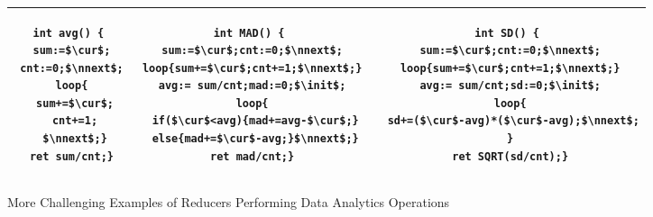 \begin{figure}
	\centering
	\lstset{language=C,
		basicstyle=\ttfamily\scriptsize}
	\begin{tabular}{|c|c|c|}
		\hline
		\begin{minipage}[t]{0.2\textwidth}
		\vspace{-0.5cm}
			\begin{lstlisting}[mathescape=true]
int avg() {
 sum:=$\cur$;
 cnt:=0;$\nnext$;
 loop{
  sum+=$\cur$;
  cnt+=1;
  $\nnext$;}
 ret sum/cnt;}
			\end{lstlisting}
		\end{minipage}&
		\begin{minipage}[t]{0.4\textwidth}
		\vspace{-0.5cm}
\begin{lstlisting}[mathescape=true]
int MAD() {
 sum:=$\cur$;cnt:=0;$\nnext$;
 loop{sum+=$\cur$;cnt+=1;$\nnext$;}
 avg:= sum/cnt;mad:=0;$\init$;
 loop{
  if($\cur$<avg){mad+=avg-$\cur$;}
  else{mad+=$\cur$-avg;}$\nnext$;}
 ret mad/cnt;}
\end{lstlisting}
		\end{minipage}&
		\begin{minipage}[t]{0.4\textwidth}
		\vspace{-0.5cm}
			\begin{lstlisting}[mathescape=true]
int SD() {
 sum:=$\cur$;cnt:=0;$\nnext$;
 loop{sum+=$\cur$;cnt+=1;$\nnext$;}
 avg:= sum/cnt;sd:=0;$\init$;
 loop{
  sd+=($\cur$-avg)*($\cur$-avg);$\nnext$;
 }
 ret SQRT(sd/cnt);}
			\end{lstlisting}
		\end{minipage}\\
		\hline		
	\end{tabular}
	\caption{More Challenging Examples of Reducers Performing Data Analytics Operations}
	\label{fig:examples2}
\vspace{-0.5cm}
\end{figure}
